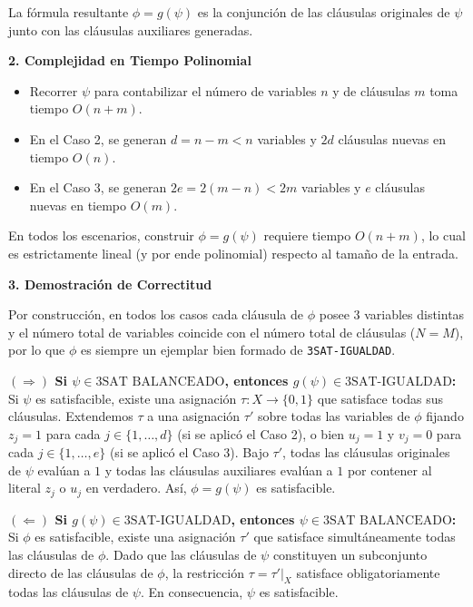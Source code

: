 La fórmula resultante $\phi = g(\psi)$ es la conjunción de las cláusulas originales de $\psi$ junto con las cláusulas auxiliares generadas.

\vspace{0.3cm}
\noindent\textbf{2. Complejidad en Tiempo Polinomial}

\begin{itemize}[leftmargin=*]
    \item Recorrer $\psi$ para contabilizar el número de variables $n$ y de cláusulas $m$ toma tiempo $O(n + m)$.
    \item En el Caso 2, se generan $d = n - m < n$ variables y $2d$ cláusulas nuevas en tiempo $O(n)$.
    \item En el Caso 3, se generan $2e = 2(m - n) < 2m$ variables y $e$ cláusulas nuevas en tiempo $O(m)$.
\end{itemize}

En todos los escenarios, construir $\phi = g(\psi)$ requiere tiempo \textbf{$O(n + m)$}, lo cual es estrictamente lineal (y por ende polinomial) respecto al tamaño de la entrada.

\vspace{0.3cm}
\noindent\textbf{3. Demostración de Correctitud}

Por construcción, en todos los casos cada cláusula de $\phi$ posee $3$ variables distintas y el número total de variables coincide con el número total de cláusulas ($N = M$), por lo que $\phi$ es siempre un ejemplar bien formado de \texttt{3SAT-IGUALDAD}.

\vspace{0.2cm}
\noindent\textbf{$(\Rightarrow)$ Si $\psi \in \text{3SAT BALANCEADO}$, entonces $g(\psi) \in \text{3SAT-IGUALDAD}$:}\\
Si $\psi$ es satisfacible, existe una asignación $\tau: X \to \{0, 1\}$ que satisface todas sus cláusulas. Extendemos $\tau$ a una asignación $\tau'$ sobre todas las variables de $\phi$ fijando $z_j = 1$ para cada $j \in \{1, \dots, d\}$ (si se aplicó el Caso 2), o bien $u_j = 1$ y $v_j = 0$ para cada $j \in \{1, \dots, e\}$ (si se aplicó el Caso 3). Bajo $\tau'$, todas las cláusulas originales de $\psi$ evalúan a $1$ y todas las cláusulas auxiliares evalúan a $1$ por contener al literal $z_j$ o $u_j$ en verdadero. Así, $\phi = g(\psi)$ es satisfacible.

\vspace{0.2cm}
\noindent\textbf{$(\Leftarrow)$ Si $g(\psi) \in \text{3SAT-IGUALDAD}$, entonces $\psi \in \text{3SAT BALANCEADO}$:}\\
Si $\phi$ es satisfacible, existe una asignación $\tau'$ que satisface simultáneamente todas las cláusulas de $\phi$. Dado que las cláusulas de $\psi$ constituyen un subconjunto directo de las cláusulas de $\phi$, la restricción $\tau = \tau'|_X$ satisface obligatoriamente todas las cláusulas de $\psi$. En consecuencia, $\psi$ es satisfacible.

